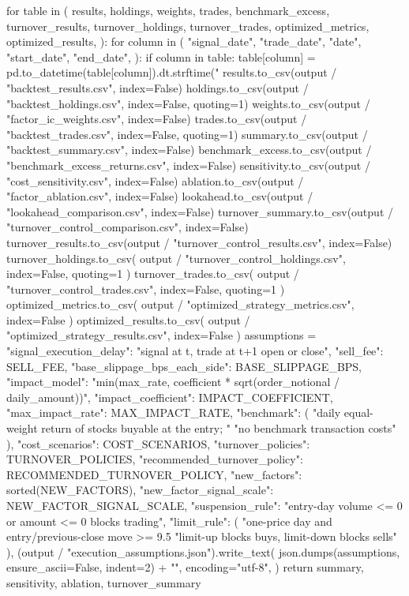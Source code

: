 \documentclass[UTF8,a4paper,fontset=fandol]{ctexart}
\begin{document}
\begin{ProjectCode}
    for table in (
        results,
        holdings,
        weights,
        trades,
        benchmark_excess,
        turnover_results,
        turnover_holdings,
        turnover_trades,
        optimized_metrics,
        optimized_results,
    ):
        for column in (
            "signal_date",
            "trade_date",
            "date",
            "start_date",
            "end_date",
        ):
            if column in table:
                table[column] = pd.to_datetime(table[column]).dt.strftime("%
    results.to_csv(output / "backtest_results.csv", index=False)
    holdings.to_csv(output / "backtest_holdings.csv", index=False, quoting=1)
    weights.to_csv(output / "factor_ic_weights.csv", index=False)
    trades.to_csv(output / "backtest_trades.csv", index=False, quoting=1)
    summary.to_csv(output / "backtest_summary.csv", index=False)
    benchmark_excess.to_csv(output / "benchmark_excess_returns.csv", index=False)
    sensitivity.to_csv(output / "cost_sensitivity.csv", index=False)
    ablation.to_csv(output / "factor_ablation.csv", index=False)
    lookahead.to_csv(output / "lookahead_comparison.csv", index=False)
    turnover_summary.to_csv(output / "turnover_control_comparison.csv", index=False)
    turnover_results.to_csv(output / "turnover_control_results.csv", index=False)
    turnover_holdings.to_csv(
        output / "turnover_control_holdings.csv", index=False, quoting=1
    )
    turnover_trades.to_csv(
        output / "turnover_control_trades.csv", index=False, quoting=1
    )
    optimized_metrics.to_csv(
        output / "optimized_strategy_metrics.csv", index=False
    )
    optimized_results.to_csv(
        output / "optimized_strategy_results.csv", index=False
    )
    assumptions = {
        "signal_execution_delay": "signal at t, trade at t+1 open or close",
        "sell_fee": SELL_FEE,
        "base_slippage_bps_each_side": BASE_SLIPPAGE_BPS,
        "impact_model": "min(max_rate, coefficient * sqrt(order_notional / daily_amount))",
        "impact_coefficient": IMPACT_COEFFICIENT,
        "max_impact_rate": MAX_IMPACT_RATE,
        "benchmark": (
            "daily equal-weight return of stocks buyable at the entry; "
            "no benchmark transaction costs"
        ),
        "cost_scenarios": COST_SCENARIOS,
        "turnover_policies": TURNOVER_POLICIES,
        "recommended_turnover_policy": RECOMMENDED_TURNOVER_POLICY,
        "new_factors": sorted(NEW_FACTORS),
        "new_factor_signal_scale": NEW_FACTOR_SIGNAL_SCALE,
        "suspension_rule": "entry-day volume <= 0 or amount <= 0 blocks trading",
        "limit_rule": (
            "one-price day and entry/previous-close move >= 9.5%
            "limit-up blocks buys, limit-down blocks sells"
        ),
    }
    (output / "execution_assumptions.json").write_text(
        json.dumps(assumptions, ensure_ascii=False, indent=2) + "\n",
        encoding="utf-8",
    )
    return summary, sensitivity, ablation, turnover_summary



\end{ProjectCode}
\end{document}
